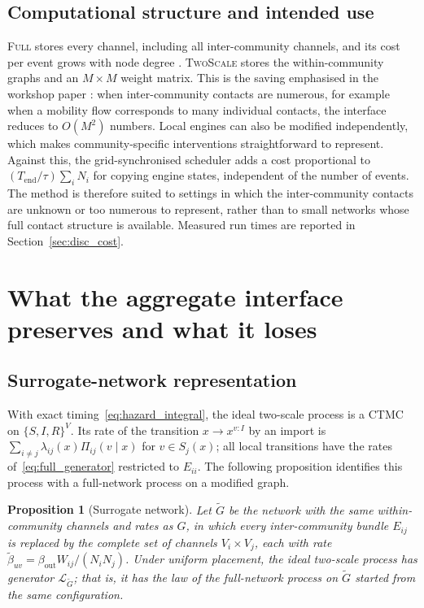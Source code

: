 \documentclass[a4paper,fleqn]{cas-sc}
\newtheorem{proposition}{Proposition}
\newcommand{\Full}{\textup{\textsc{Full}}}
\newcommand{\TS}{\textup{\textsc{TwoScale}}}
\begin{document}
\subsection{Computational structure and intended use}
\label{sec:cost}

\Full{} stores every channel, including all inter-community channels, and its cost per event grows with node degree \citep{kuryliak2025simulating}. \TS{} stores the within-community graphs and an $M\times M$ weight matrix. This is the saving emphasised in the workshop paper \citep{kuryliak2025towards}: when inter-community contacts are numerous, for example when a mobility flow corresponds to many individual contacts, the interface reduces to $O(M^2)$ numbers. Local engines can also be modified independently, which makes community-specific interventions straightforward to represent. Against this, the grid-synchronised scheduler adds a cost proportional to $(T_{\mathrm{end}}/\tau)\sum_iN_i$ for copying engine states, independent of the number of events. The method is therefore suited to settings in which the inter-community contacts are unknown or too numerous to represent, rather than to small networks whose full contact structure is available. Measured run times are reported in Section~\ref{sec:disc_cost}.

\section{What the aggregate interface preserves and what it loses}
\label{sec:analysis}

\subsection{Surrogate-network representation}
\label{sec:surrogate}

With exact timing~\eqref{eq:hazard_integral}, the ideal two-scale process is a CTMC on $\{S,I,R\}^V$. Its rate of the transition $x\to x^{v:I}$ by an import is $\sum_{i\neq j}\lambda_{ij}(x)\Pi_{ij}(v\mid x)$ for $v\in S_j(x)$; all local transitions have the rates of~\eqref{eq:full_generator} restricted to $E_{ii}$. The following proposition identifies this process with a full-network process on a modified graph.

\begin{proposition}[Surrogate network]
\label{prop:surrogate}
Let $\tilde G$ be the network with the same within-community channels and rates as $G$, in which every inter-community bundle $E_{ij}$ is replaced by the complete set of channels $V_i\times V_j$, each with rate $\tilde\beta_{uv}=\beta_{\mathrm{out}}W_{ij}/(N_iN_j)$. Under uniform placement, the ideal two-scale process has generator $\mathcal{L}_{\tilde G}$; that is, it has the law of the full-network process on $\tilde G$ started from the same configuration.
\end{proposition}
\end{document}
